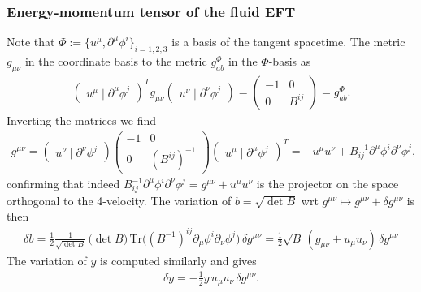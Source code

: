 \subsubsection{Energy-momentum tensor of the fluid EFT}


Note that $\Phi:=\{u^\mu, \partial^\mu \phi^i\}_{i=1,2,3}$ is a basis of the tangent spacetime.
The metric $g_{\mu\nu}$ in the coordinate basis to the metric $g^\Phi_{ab}$ in the $\Phi$-basis as
\begin{align}
     \begin{pmatrix} u^\mu \mid  \partial^\mu \phi^j\end{pmatrix}^T g_{\mu\nu} \begin{pmatrix} u^\nu  \mid  \partial^\nu \phi^j\end{pmatrix}= \begin{pmatrix} -1 & 0\\ 0 & B^{ij}\end{pmatrix} = g^{\Phi}_{ab}.
\end{align}
Inverting the matrices we find 
\begin{align}
    g^{\mu\nu}=\begin{pmatrix} u^\nu  \mid  \partial^\nu \phi^j\end{pmatrix}\begin{pmatrix} -1 & 0\\ 0 & (B^{ij})^{-1}\end{pmatrix} \begin{pmatrix} u^\mu \mid  \partial^\mu \phi^j\end{pmatrix}^T = -u^\mu u^\nu + B^{-1}_{ij} \partial^\mu \phi^i \partial^\nu \phi^j,
\end{align}
confirming that indeed $B^{-1}_{ij} \partial^\mu \phi^i \partial^\nu \phi^j= g^{\mu\nu}+u^\mu u^\nu$ is the projector on the space orthogonal to the 4-velocity.
The variation of $b=\sqrt{\det B}$ wrt $g^{\mu\nu}\mapsto g^{\mu\nu}+\delta g^{\mu\nu}$ is then
\begin{align}
    \delta b= \tfrac12 \frac{1}{\sqrt{\det B}}\, \big(\det B\big)\, \text{Tr}\Big((B^{-1})^{ij} \partial_\mu \phi^i \partial_\nu \phi^j\Big) \, \delta g^{\mu\nu} = \tfrac12 \sqrt{B}\,  (g_{\mu\nu}+u_\mu u_\nu)\, \delta g^{\mu\nu}
\end{align}
The variation of $y$ is computed similarly and gives
\begin{align}
    \delta y = -\tfrac12 y \, u_\mu u_\nu \, \delta g^{\mu\nu}.
\end{align}
